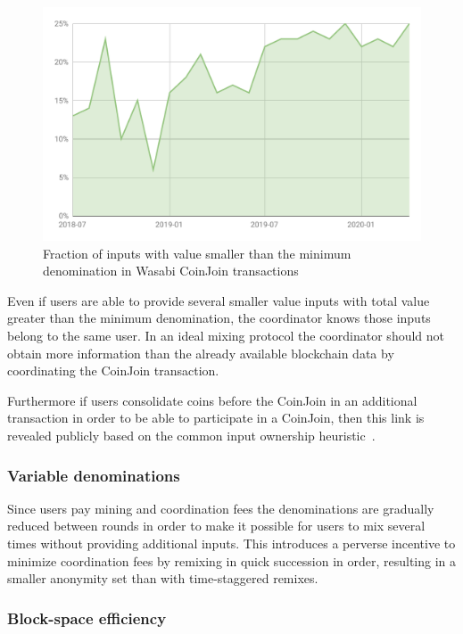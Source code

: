 \documentclass{article}
\begin{document}
\begin{figure}[h!]
    \centering
    \includegraphics[scale=0.4]{Figures/SmallValueInputsWasabi.pdf}
    \caption{Fraction of inputs with value smaller than the minimum denomination in Wasabi CoinJoin transactions}
    \label{fig:minimumdenomination}
\end{figure}

Even if users are able to provide several smaller value inputs with total value greater than the minimum denomination, the coordinator knows those inputs belong to the same user.  In an ideal mixing protocol the coordinator should not obtain more information than the already available blockchain data by coordinating the CoinJoin transaction.

Furthermore if users consolidate coins before the CoinJoin in an additional transaction in order to be able to participate in a CoinJoin, then this link is revealed publicly based on the common input ownership heuristic~\cite{meiklejohn2013fistful}.

\subsubsection{Variable denominations} Since users pay mining and coordination fees the denominations are gradually reduced between rounds in order to make it possible for users to mix several times without providing additional inputs. This introduces a perverse incentive to minimize coordination fees by remixing in quick succession in order, resulting in a smaller anonymity set than with time-staggered remixes.

\subsubsection{Block-space efficiency}
\end{document}
